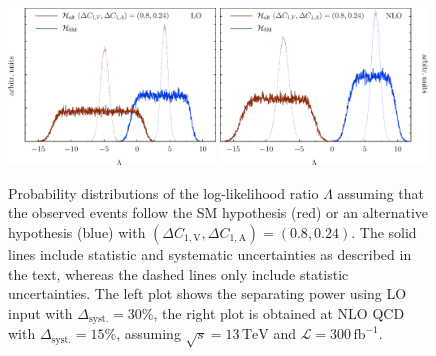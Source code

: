 \documentclass[preprint]{JHEP3} %
\newcommand{\TeV}{\mathrm{TeV}}
\newcommand{\SM}{\mathrm{SM}}
\newcommand{\alt}{\mathrm{alt}}
\def\invfb {\mathrm{fb}^{-1}}
\def\DConeA{\Delta C_{1,\mathrm{A}}}
\def\DConeV{\Delta C_{1,\mathrm{V}}}
\def\HSM{\mathcal{H}_{\mathrm{SM}}}
\def\Halt{\mathcal{H}_{\mathrm{alt}}}
\newcommand{\be}{\begin{eqnarray}}
\newcommand{\ee}{\end{eqnarray}}
\begin{document}
\begin{figure}[t]
\centering %
\includegraphics[width=0.49\textwidth]{./LogLikelihoods_LO.eps}
\hfill
\includegraphics[width=0.49\textwidth]{./LogLikelihoods_NLO.eps}
\caption{\label{fig:vii}
Probability distributions of the log-likelihood ratio $\Lambda$ assuming that the observed events follow the SM hypothesis (red) or an alternative hypothesis (blue) 
with $(\DConeV,\DConeA)=(0.8,0.24)$.
The solid lines include statistic and systematic uncertainties as described in the text, whereas the dashed lines only include statistic uncertainties.
The left plot shows the separating power using LO input with $\Delta_\mathrm{syst.}=30\%$, 
the right plot is obtained at NLO QCD with $\Delta_\mathrm{syst.}=15\%$, assuming $\sqrt{s}=13\,\TeV$ and $\mathcal{L}=300\,\invfb$.
}
\end{figure}
\end{document}

